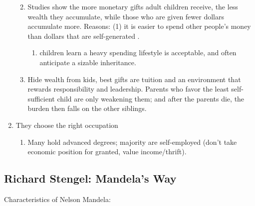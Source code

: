 \documentclass[
]{article}
\providecommand{\tightlist}{%
  \setlength{\itemsep}{0pt}\setlength{\parskip}{0pt}}
\begin{document}
\begin{enumerate}
  \begin{enumerate}
  \def\labelenumii{\arabic{enumii}.}
  \setcounter{enumii}{6}
  \tightlist
  \item
    Studies show the more monetary gifts adult children receive, the
    less wealth they accumulate, while those who are given fewer dollars
    accumulate more. Reasons: (1) it is easier to spend other people's
    money than dollars that are self-generated .

    \begin{enumerate}
    \def\labelenumiii{(\arabic{enumiii})}
    \setcounter{enumiii}{1}
    \tightlist
    \item
      children learn a heavy spending lifestyle is acceptable, and often
      anticipate a sizable inheritance.
    \end{enumerate}
  \item
    Hide wealth from kids, best gifts are tuition and an environment
    that rewards responsibility and leadership. Parents who favor the
    least self-sufficient child are only weakening them; and after the
    parents die, the burden then falls on the other siblings.
  \end{enumerate}
\item
  They choose the right occupation

  \begin{enumerate}
  \def\labelenumii{\arabic{enumii}.}
  \setcounter{enumii}{8}
  \tightlist
  \item
    Many hold advanced degrees; majority are self-employed (don't take
    economic position for granted, value income/thrift).
  \end{enumerate}
\end{enumerate}

\hypertarget{richard-stengel-mandelas-way}{%
\subsection{Richard Stengel: Mandela's
Way}\label{richard-stengel-mandelas-way}}

Characteristics of Nelson Mandela:
\end{document}
